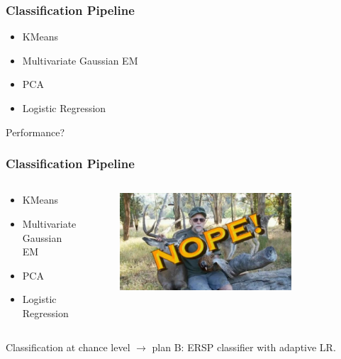 \documentclass{beamer}
\begin{document}
\begin{frame}
  \frametitle{Classification Pipeline}
  
  \begin{itemize}
    \item KMeans
    \item Multivariate Gaussian EM
    \item PCA
    \item Logistic Regression
  \end{itemize}
  Performance?
\end{frame}

\begin{frame}
  \frametitle{Classification Pipeline}
    \begin{columns}

  \begin{column}{0.5\textwidth}
\begin{itemize}
    \item KMeans     
    \item Multivariate Gaussian EM
    \item PCA
    \item Logistic Regression
  \end{itemize}

  \end{column}
 
  \begin{column}{0.5\textwidth}
  \begin{figure}
    \includegraphics[width=0.8\textwidth, right]{chucktesta.jpeg}
  \end{figure}
  \end{column}
\end{columns}
 \vfill
    Classification at chance level $\rightarrow$ plan B: ERSP classifier with adaptive LR.

\end{frame}
\end{document}
